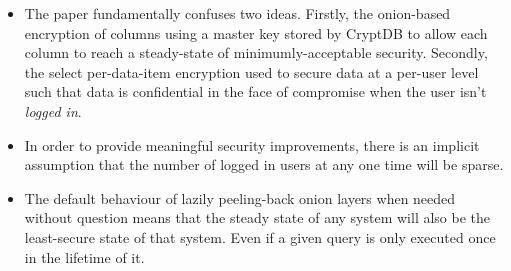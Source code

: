 \documentclass[11pt]{article}
\begin{document}
\begin{itemize}

    \item The paper fundamentally confuses two ideas. Firstly, the onion-based
    encryption of columns using a master key stored by CryptDB to allow each
    column to reach a steady-state of minimumly-acceptable security. Secondly,
    the select per-data-item encryption used to secure data at a per-user level
    such that data is confidential in the face of compromise when the user
    isn't \textit{logged in}.




    \item In order to provide meaningful security improvements, there is an
    implicit assumption that the number of logged in users at any one time will
    be sparse.


    \item The default behaviour of lazily peeling-back onion layers when needed
    without question means that the steady state of any system will also be the
    least-secure state of that system. Even if a given query is only executed
    once in the lifetime of it.





\end{itemize}
\end{document}
